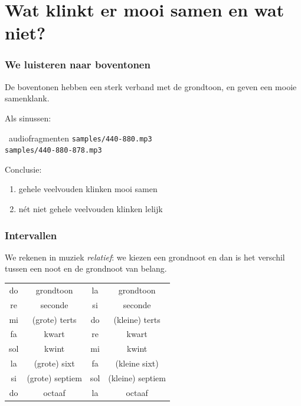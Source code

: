 \documentclass[compress, darktitle, framenumber, handout, totalframenumber]{beamer}
\begin{document}
\section{Wat klinkt er mooi samen en wat niet?}

\begin{frame}
  \frametitle{We luisteren naar boventonen}

  De boventonen hebben een sterk verband met de grondtoon, en geven een mooie samenklank.

  \pause

  Als sinussen:
  \begin{block}{\twonotes\ audiofragmenten}
    \texttt{samples/440-880.mp3} \\
    \texttt{samples/440-880-878.mp3} \\
  \end{block}

  \pause
  Conclusie:
  \begin{enumerate}
    \item gehele veelvouden klinken mooi samen
    \item n\'et niet gehele veelvouden klinken lelijk
  \end{enumerate}
\end{frame}

\begin{frame}
  \frametitle{Intervallen}

  We rekenen in muziek \emph{relatief}: we kiezen een grondnoot en dan is het verschil tussen een noot en de grondnoot van belang.

  \begin{center}
    \begin{tabular}{cc|cc}
      do & grondtoon & la & grondtoon \\
      re & seconde & si & seconde \\
      mi & (grote) terts & do & (kleine) terts \\
      fa & kwart & re & kwart \\
      sol & kwint & mi & kwint \\
      la & (grote) sixt & fa & (kleine sixt) \\
      si & (grote) septiem & sol & (kleine) septiem \\
      do & octaaf & la & octaaf
    \end{tabular}
  \end{center}
\end{frame}
\end{document}
